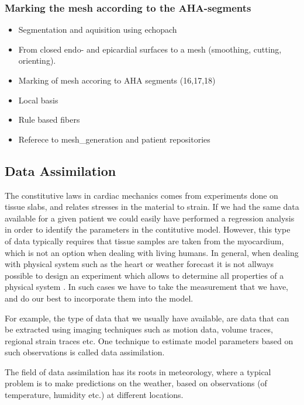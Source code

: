 \subsubsection{Marking the mesh according to the AHA-segments}



\begin{itemize}
  \item Segmentation and aquisition using echopach
  \item From closed endo- and epicardial surfaces to a mesh
    (smoothing, cutting, orienting).
  \item Marking of mesh accoring to AHA segments (16,17,18)
  \item Local basis
  \item Rule based fibers
  \item Referece to mesh{\_}generation and patient repositories
  \end{itemize}


\subsection{Data Assimilation}
The constitutive laws in cardiac mechanics comes from experiments
done on tissue slabs, and relates stresses in the material to strain.
If we had the same data available for a given patient we could easily
have performed a regression analysis in order to identify the
parameters in the contitutive model. However, this type of data
typically requires that tissue samples are taken from the myocardium,
which is not an option when dealing with living humans. In general,
when dealing with physical system such as the heart or weather
forecast it is not allways possible to design an experiment which
allows to determine all properties of a physical system
\cite{chapelle2013fundamental}. In such cases we have to take the
measurement that we have, and do our best to incorporate them into the
model. 

For example, the type of data that we usually have available, are data
that can be extracted using imaging techniques such as motion data,
volume traces, regional strain traces etc. One technique to estimate
model parameters based on such observations is called data assimilation.


The field of data assimilation has its roots in meteorology, where
a typical problem is to make predictions on the weather, based on
observations (of temperature, humidity etc.) at different locations. 


